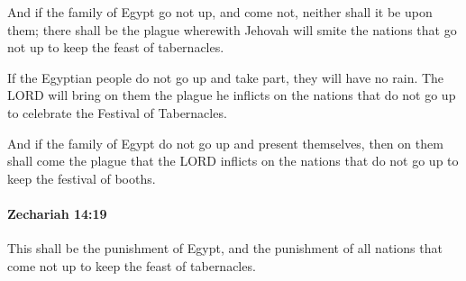 			\begin{versebox}
					\item[BHS] 
					\item[LXX] 
					\item[ASV] And if the family of Egypt go not up, and come not, neither shall it be upon them; there shall be the plague wherewith Jehovah will smite the nations that go not up to keep the feast of tabernacles.
					\item[NIV] If the Egyptian people do not go up and take part, they will have no rain. The LORD will bring on them the plague he inflicts on the nations that do not go up to celebrate the Festival of Tabernacles.
					\item[NRSV] And if the family of Egypt do not go up and present themselves, then on them shall come the plague that the LORD inflicts on the nations that do not go up to keep the festival of booths.
			\end{versebox}

		\paragraph{Zechariah 14:19} %
			\label{ZECHARIAH-14-19}

			This shall be the punishment of Egypt, and the punishment of all nations that come not up to keep the feast of tabernacles.

